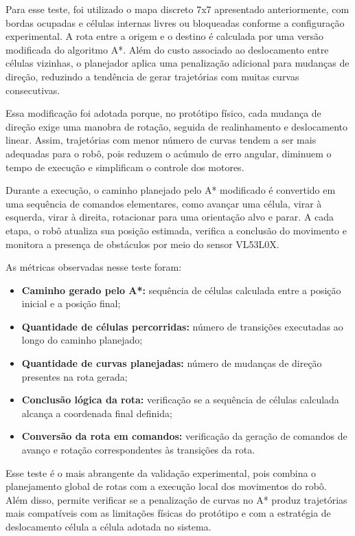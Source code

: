 \documentclass[	12pt, Times, openright, twoside, a4paper, english, brazil]{abntex2}
\begin{document}
Para esse teste, foi utilizado o mapa discreto 7x7 apresentado anteriormente, com bordas ocupadas e células internas livres ou bloqueadas conforme a configuração experimental. A rota entre a origem e o destino é calculada por uma versão modificada do algoritmo A*. Além do custo associado ao deslocamento entre células vizinhas, o planejador aplica uma penalização adicional para mudanças de direção, reduzindo a tendência de gerar trajetórias com muitas curvas consecutivas.

Essa modificação foi adotada porque, no protótipo físico, cada mudança de direção exige uma manobra de rotação, seguida de realinhamento e deslocamento linear. Assim, trajetórias com menor número de curvas tendem a ser mais adequadas para o robô, pois reduzem o acúmulo de erro angular, diminuem o tempo de execução e simplificam o controle dos motores.

Durante a execução, o caminho planejado pelo A* modificado é convertido em uma sequência de comandos elementares, como avançar uma célula, virar à esquerda, virar à direita, rotacionar para uma orientação alvo e parar. A cada etapa, o robô atualiza sua posição estimada, verifica a conclusão do movimento e monitora a presença de obstáculos por meio do sensor VL53L0X.

As métricas observadas nesse teste foram:

\begin{itemize}
	\item \textbf{Caminho gerado pelo A*:} sequência de células calculada entre a posição inicial e a posição final;
	\item \textbf{Quantidade de células percorridas:} número de transições executadas ao longo do caminho planejado;
	\item \textbf{Quantidade de curvas planejadas:} número de mudanças de direção presentes na rota gerada;
	\item \textbf{Conclusão lógica da rota:} verificação se a sequência de células calculada alcança a coordenada final definida;
	\item \textbf{Conversão da rota em comandos:} verificação da geração de comandos de avanço e rotação correspondentes às transições da rota.
\end{itemize}

Esse teste é o mais abrangente da validação experimental, pois combina o planejamento global de rotas com a execução local dos movimentos do robô. Além disso, permite verificar se a penalização de curvas no A* produz trajetórias mais compatíveis com as limitações físicas do protótipo e com a estratégia de deslocamento célula a célula adotada no sistema.
\end{document}

